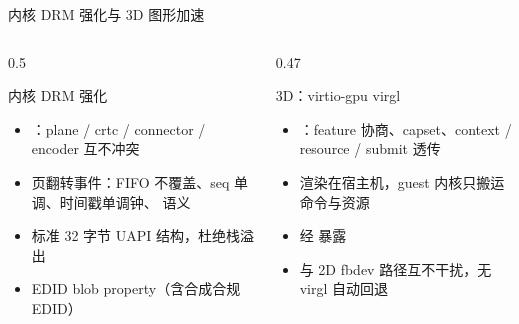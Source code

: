 \documentclass[aspectratio=1610]{beamer}
\begin{document}
\begin{frame}{内核 DRM 强化与 3D 图形加速}
    \begin{columns}[t]
        \begin{column}{0.5\textwidth}
            \begin{block}{内核 DRM 强化}
                \footnotesize
                \begin{itemize}
                    \item {}：plane / crtc / connector / encoder 互不冲突
                    \item 页翻转事件：FIFO 不覆盖、seq 单调、时间戳单调钟、 语义
                    \item 标准 32 字节 UAPI 结构，杜绝栈溢出
                    \item EDID blob property（含合成合规 EDID）
                \end{itemize}
            \end{block}
        \end{column}
        \begin{column}{0.47\textwidth}
            \begin{block}{3D：virtio-gpu virgl}
                \footnotesize
                \begin{itemize}
                    \item {}：feature 协商、capset、context / resource / submit 透传
                    \item 渲染在宿主机，guest 内核只搬运命令与资源
                    \item {} 经  暴露
                    \item 与 2D fbdev 路径互不干扰，无 virgl 自动回退
                \end{itemize}
            \end{block}
        \end{column}
    \end{columns}
    \vspace{0.3em}
\end{frame}

\renewcommand{\azsectionsummary}{%
    面向 BuildStorm 热区的 14 项优化全部保留真实计时；%
    双架构 BuildStorm 2551/2315 s $\rightarrow$ 1483/1399 s，用例 180/180 全过。}
\end{document}
